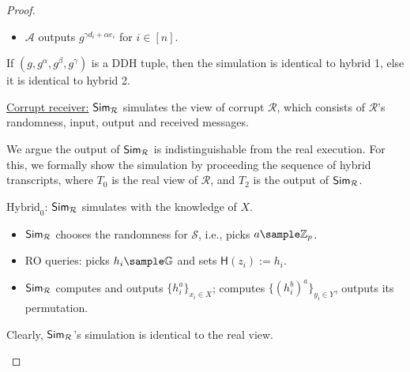 \begin{proof}
\begin{trivlist}
\begin{itemize}
    \item $\mathcal{A}$ outputs $g^{\gamma d_i + \alpha e_i}$ for $i \in [n]$.      
\end{itemize}

If $(g, g^\alpha, g^\beta, g^\gamma)$ is a DDH tuple, then the simulation is identical to hybrid 1, 
else it is identical to hybrid 2. 
\end{trivlist}

\begin{trivlist}
\item \underline{Corrupt receiver:} $\mathsf{Sim}_\mathcal{R}$ simulates the view of corrupt $\mathcal{R}$, 
    which consists of $\mathcal{R}$'s randomness, input, output and received messages.
 
    We argue the output of $\mathsf{Sim}_\mathcal{R}$ is indistinguishable from the real execution. 
    For this, we formally show the simulation by proceeding the sequence of hybrid transcripts, 
    where $T_0$ is the real view of $\mathcal{R}$, and $T_2$ is the output of $\mathsf{Sim}_\mathcal{R}$. 

\item $\text{Hybrid}_0$: $\mathsf{Sim}_\mathcal{R}$ simulates with the knowledge of $X$. 
\begin{itemize}
    \item $\mathsf{Sim}_\mathcal{R}$ chooses the randomness for $\mathcal{S}$, i.e., picks $a \sample \mathbb{Z}_p$.
    
    \item RO queries: picks $h_i \sample \mathbb{G}$ and sets $\mathsf{H}(z_i):=h_i$. 

    \item $\mathsf{Sim}_\mathcal{R}$ computes and outputs $\{h_i^{a}\}_{x_i \in X}$; 
        computes $\{(h_i^{b})^a\}_{y_i \in Y}$, outputs its permutation.      
\end{itemize}
Clearly, $\mathsf{Sim}_\mathcal{R}$'s simulation is identical to the real view. 

\begin{center}
\end{center}


\end{trivlist}
\end{proof}
